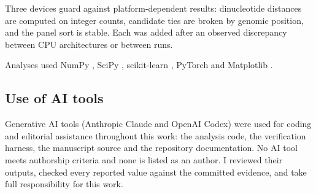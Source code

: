 Three devices guard against platform-dependent results: dinucleotide distances are computed on
integer counts, candidate ties are broken by genomic position, and the panel sort is stable.
Each was added after an observed discrepancy between CPU architectures or between runs.

Analyses used NumPy \citep{numpy}, SciPy \citep{scipy}, scikit-learn \citep{sklearn}, PyTorch
\citep{pytorch} and Matplotlib \citep{matplotlib}.

\subsection{Use of AI tools}
\label{sec:aitools}

Generative AI tools (Anthropic Claude and OpenAI Codex) were used for coding and editorial
assistance throughout this work: the analysis code, the verification harness, the manuscript
source and the repository documentation. No AI tool meets authorship criteria and none is
listed as an author. I reviewed their outputs, checked every reported value against the
committed evidence, and take full responsibility for this work.
